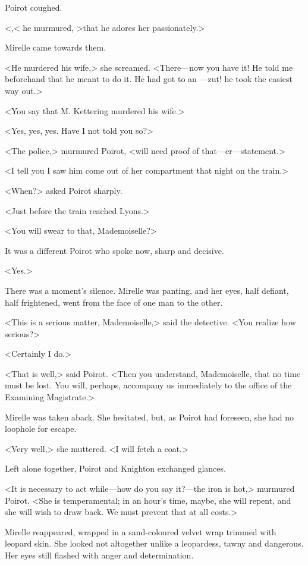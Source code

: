 Poirot coughed.

<,< he murmured, >that he adores her passionately.>

Mirelle came towards them.

<He murdered his wife,> she screamed. <There—now you have it! He told me beforehand that he meant to do it. He had got to an —zut! he took the easiest way out.>

<You say that M. Kettering murdered his wife.>

<Yes, yes, yes. Have I not told you so?>

<The police,> murmured Poirot, <will need proof of that—er—statement.>

<I tell you I saw him come out of her compartment that night on the train.>

<When?> asked Poirot sharply.

<Just before the train reached Lyons.>

<You will swear to that, Mademoiselle?>

It was a different Poirot who spoke now, sharp and decisive.

<Yes.>

There was a moment's silence. Mirelle was panting, and her eyes, half defiant, half frightened, went from the face of one man to the other.

<This is a serious matter, Mademoiselle,> said the detective. <You realize how serious?>

<Certainly I do.>

<That is well,> said Poirot. <Then you understand, Mademoiselle, that no time must be lost. You will, perhaps, accompany us immediately to the office of the Examining Magistrate.>

Mirelle was taken aback. She hesitated, but, as Poirot had foreseen, she had no loophole for escape.

<Very well,> she muttered. <I will fetch a coat.>

Left alone together, Poirot and Knighton exchanged glances.

<It is necessary to act while—how do you say it?—the iron is hot,> murmured Poirot. <She is temperamental; in an hour's time, maybe, she will repent, and she will wish to draw back. We must prevent that at all costs.>

Mirelle reappeared, wrapped in a sand-coloured velvet wrap trimmed with leopard skin. She looked not altogether unlike a leopardess, tawny and dangerous. Her eyes still flashed with anger and determination.


